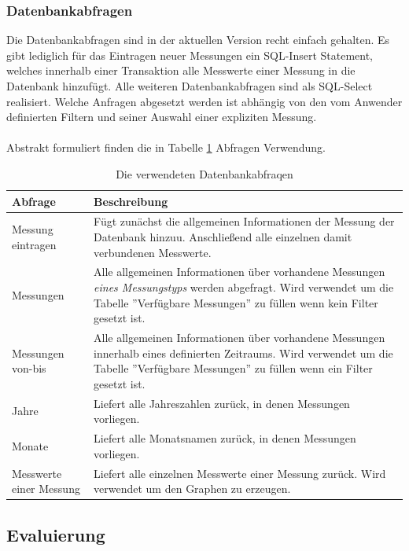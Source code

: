 \subsubsection{Datenbankabfragen}
Die Datenbankabfragen sind in der aktuellen Version recht einfach gehalten. Es gibt lediglich für das Eintragen neuer Messungen ein SQL-Insert Statement, welches innerhalb einer Transaktion alle Messwerte einer Messung in die Datenbank hinzufügt. Alle weiteren Datenbankabfragen sind als SQL-Select realisiert. Welche Anfragen abgesetzt werden ist abhängig von den vom Anwender definierten Filtern und seiner Auswahl einer expliziten Messung.\\
\\
Abstrakt formuliert finden die in Tabelle \ref{tbl:database-queries-abstract} Abfragen Verwendung.
\begin{table}[h]
	\centering
		\begin{tabularx}{\textwidth}{l|X}
			\hline
			Abfrage & Beschreibung \\
			\hline
			\hline
			Messung eintragen & Fügt zunächst die allgemeinen Informationen der Messung der Datenbank hinzuu. Anschließend alle einzelnen damit verbundenen Messwerte.\\
			\hline
			Messungen & Alle allgemeinen Informationen über vorhandene Messungen \textit{eines Messungstyps} werden abgefragt. Wird verwendet um die Tabelle ''Verfügbare Messungen'' zu füllen wenn kein Filter gesetzt ist.\\
			\hline
			Messungen von-bis & Alle allgemeinen Informationen über vorhandene Messungen innerhalb eines definierten Zeitraums.  Wird verwendet um die Tabelle ''Verfügbare Messungen'' zu füllen wenn ein Filter gesetzt ist.\\
			\hline
			Jahre & Liefert alle Jahreszahlen zurück, in denen Messungen vorliegen.\\
			\hline
			Monate & Liefert alle Monatsnamen zurück, in denen Messungen vorliegen.\\
			\hline
			Messwerte einer Messung & Liefert alle einzelnen Messwerte einer Messung zurück. Wird verwendet um den Graphen zu erzeugen.\\
			\hline
		\end{tabularx}
		\caption{Die verwendeten Datenbankabfraqen}
		\label{tbl:database-queries-abstract}			
\end{table}

\subsection{Evaluierung} \label{sec:Evaluierung}

